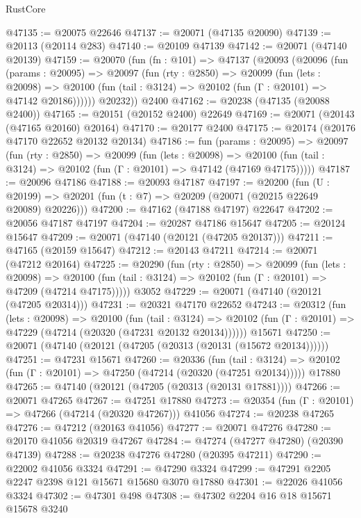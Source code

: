 \begin{lexlean}{RustCore}
\begin{coremodule}
@47135 := @20075 @22646
@47137 := @20071 (@47135 @20090)
@47139 := @20113 (@20114 @283)
@47140 := @20109 @47139
@47142 := @20071 (@47140 @20139)
@47159 := @20070
    (fun (fn : @101) =>
    @47137
      (@20093
        (@20096
          (fun (params : @20095) =>
          @20097
            (fun (rty : @2850) =>
            @20099
              (fun (lets : @20098) =>
              @20100 (fun (tail : @3124) => @20102 (fun (Γ : @20101) => @47142 @20186))))))
        @20232))
    @2400
@47162 := @20238 (@47135 (@20088 @2400))
@47165 := @20151 (@20152 @2400) @22649
@47169 := @20071 (@20143 (@47165 @20160) @20164)
@47170 := @20177 @2400
@47175 := @20174 (@20176 @47170 @22652 @20132 @20134)
@47186 := fun (params : @20095) =>
  @20097
    (fun (rty : @2850) =>
    @20099
      (fun (lets : @20098) =>
      @20100 (fun (tail : @3124) => @20102 (fun (Γ : @20101) => @47142 (@47169 @47175)))))
@47187 := @20096 @47186
@47188 := @20093 @47187
@47197 := @20200
    (fun (U : @20199) => @20201 (fun (t : @7) => @20209 (@20071 (@20215 @22649 @20089) @20226)))
@47200 := @47162 (@47188 @47197) @22647
@47202 := @20056 @47187 @47197
@47204 := @20287 @47186 @15647
@47205 := @20124 @15647
@47209 := @20071 (@47140 (@20121 (@47205 @20137)))
@47211 := @47165 (@20159 @15647)
@47212 := @20143 @47211
@47214 := @20071 (@47212 @20164)
@47225 := @20290
    (fun (rty : @2850) =>
    @20099
      (fun (lets : @20098) =>
      @20100 (fun (tail : @3124) => @20102 (fun (Γ : @20101) => @47209 (@47214 @47175)))))
    @3052
@47229 := @20071 (@47140 (@20121 (@47205 @20314)))
@47231 := @20321 @47170 @22652
@47243 := @20312
    (fun (lets : @20098) =>
    @20100
      (fun (tail : @3124) =>
      @20102 (fun (Γ : @20101) => @47229 (@47214 (@20320 (@47231 @20132 @20134))))))
    @15671
@47250 := @20071 (@47140 (@20121 (@47205 (@20313 (@20131 (@15672 @20134))))))
@47251 := @47231 @15671
@47260 := @20336
    (fun (tail : @3124) => @20102 (fun (Γ : @20101) => @47250 (@47214 (@20320 (@47251 @20134)))))
    @17880
@47265 := @47140 (@20121 (@47205 (@20313 (@20131 @17881))))
@47266 := @20071 @47265
@47267 := @47251 @17880
@47273 := @20354 (fun (Γ : @20101) => @47266 (@47214 (@20320 @47267))) @41056
@47274 := @20238 @47265
@47276 := @47212 (@20163 @41056)
@47277 := @20071 @47276
@47280 := @20170 @41056 @20319 @47267
@47284 := @47274 (@47277 @47280) (@20390 @47139)
@47288 := @20238 @47276 @47280 (@20395 @47211)
@47290 := @22002 @41056 @3324
@47291 := @47290 @3324
@47299 := @47291 @2205 @2247 @2398 @121 @15671 @15680 @3070 @17880
@47301 := @22026 @41056 @3324
@47302 := @47301 @498
@47308 := @47302 @2204 @16 @18 @15671 @15678 @3240

\end{coremodule}
\end{lexlean}
